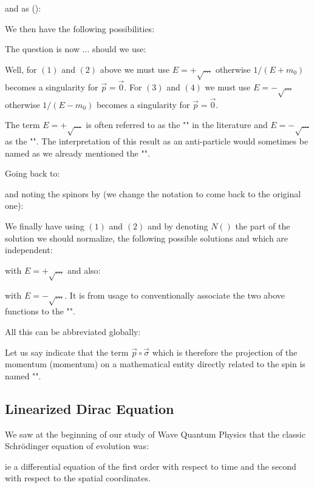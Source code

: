 	and as ():
	
	We then have the following possibilities:
	
	The question is now ... should we use:
 	
	Well, for $(1)$ and $(2)$ above we must use $E=+\sqrt{\ldots}$ otherwise $1/(E+m_0)$ becomes a singularity for $\vec{p}=\vec{0}$. For $(3)$ and $(4)$ we must use $E=-\sqrt{\ldots}$ otherwise $1/(E-m_0)$ becomes a singularity for $\vec{p}=\vec{0}$.
	\begin{tcolorbox}[title=Remark,colframe=black,arc=10pt]
	The term $E=+\sqrt{\ldots}$ is often referred to as the "" in the literature and $E=-\sqrt{\ldots}$ as the "". The interpretation of this result as an anti-particle would sometimes be named as we already mentioned the "".
	\end{tcolorbox}
	Going back to:
	
	and noting the spinors by (we change the notation to come back to the original one):
	
	We finally have using $(1)$ and $(2)$ and by denoting $N()$ the part of the solution we should normalize, the following possible solutions and which are independent:
	
	
	with $E=+\sqrt{\ldots}$ and also:
	
	
	with $E=-\sqrt{\ldots}$. It is from usage to conventionally associate the two above functions to the "".

	All this can be abbreviated globally:
	
	Let us say indicate that the term $\vec{p}\circ\vec{\sigma}$ which is therefore the projection of the momentum (momentum) on a mathematical entity directly related to the spin is named "".
	
	\subsection{Linearized Dirac Equation}
	We saw at the beginning of our study of Wave Quantum Physics that the classic Schrödinger equation of evolution was:
	
	ie a differential equation of the first order with respect to time and the second with respect to the spatial coordinates.

